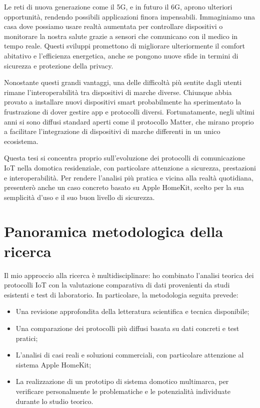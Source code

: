 \vspace{0.5cm}
Le reti di nuova generazione come il 5G, e in futuro il 6G, aprono ulteriori opportunità, rendendo possibili applicazioni finora impensabili. Immaginiamo una casa dove possiamo usare realtà aumentata per controllare dispositivi o monitorare la nostra salute grazie a sensori che comunicano con il medico in tempo reale. Questi sviluppi promettono di migliorare ulteriormente il comfort abitativo e l’efficienza energetica, anche se pongono nuove sfide in termini di sicurezza e protezione della privacy.

\vspace{0.5cm}
Nonostante questi grandi vantaggi, una delle difficoltà più sentite dagli utenti rimane l’interoperabilità tra dispositivi di marche diverse. Chiunque abbia provato a installare nuovi dispositivi smart probabilmente ha sperimentato la frustrazione di dover gestire app e protocolli diversi. Fortunatamente, negli ultimi anni si sono diffusi standard aperti come il protocollo Matter, che mirano proprio a facilitare l’integrazione di dispositivi di marche differenti in un unico ecosistema.

\vspace{0.5cm}
Questa tesi si concentra proprio sull'evoluzione dei protocolli di comunicazione IoT nella domotica residenziale, con particolare attenzione a sicurezza, prestazioni e interoperabilità. Per rendere l'analisi più pratica e vicina alla realtà quotidiana, presenterò anche un caso concreto basato su Apple HomeKit, scelto per la sua semplicità d'uso e il suo buon livello di sicurezza.

\section{Panoramica metodologica della ricerca}
Il mio approccio alla ricerca è multidisciplinare: ho combinato l’analisi teorica dei protocolli IoT con la valutazione comparativa di dati provenienti da studi esistenti e test di laboratorio. In particolare, la metodologia seguita prevede:

\begin{itemize}
\item Una revisione approfondita della letteratura scientifica e tecnica disponibile;
\item Una comparazione dei protocolli più diffusi basata su dati concreti e test pratici;
\item L'analisi di casi reali e soluzioni commerciali, con particolare attenzione al sistema Apple HomeKit;
\item La realizzazione di un prototipo di sistema domotico multimarca, per verificare personalmente le problematiche e le potenzialità individuate durante lo studio teorico.
\end{itemize}


